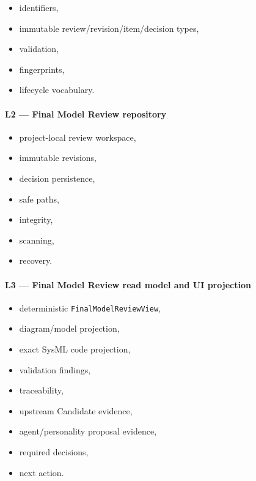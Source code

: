 \begin{itemize}
\tightlist
\item
  identifiers,
\item
  immutable review/revision/item/decision types,
\item
  validation,
\item
  fingerprints,
\item
  lifecycle vocabulary.
\end{itemize}

\hypertarget{l2--final-model-review-repository}{%
\paragraph{L2 --- Final Model Review repository}\label{l2--final-model-review-repository}}

\begin{itemize}
\tightlist
\item
  project-local review workspace,
\item
  immutable revisions,
\item
  decision persistence,
\item
  safe paths,
\item
  integrity,
\item
  scanning,
\item
  recovery.
\end{itemize}

\hypertarget{l3--final-model-review-read-model-and-ui-projection}{%
\paragraph{L3 --- Final Model Review read model and UI projection}\label{l3--final-model-review-read-model-and-ui-projection}}

\begin{itemize}
\tightlist
\item
  deterministic \texttt{FinalModelReviewView},
\item
  diagram/model projection,
\item
  exact SysML code projection,
\item
  validation findings,
\item
  traceability,
\item
  upstream Candidate evidence,
\item
  agent/personality proposal evidence,
\item
  required decisions,
\item
  next action.
\end{itemize}

